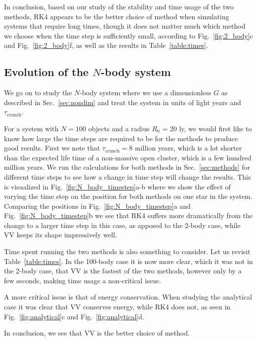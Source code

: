 \documentclass{article}
\begin{document}
\begin{multicols}{2}
In conclusion, based on our study of the stability and time usage of the two methods, RK4 appears to be the better choice of method when simulating systems that require long times, though it does not matter much which method we choose when the time step is sufficiently small, according to Fig.~\ref{fig:2_body}c and Fig.~\ref{fig:2_body}f, as well as the results in Table~\ref{table:times}.



\subsection{Evolution of the $N$-body system}
We go on to study the $N$-body system where we use a dimensionless $G$ as described in Sec.~\ref{sec:nondim} and treat the system in units of light years and $\tau_{\mathrm{crunch}}$. 

For a system with $N = 100$ objects and a radius $R_0$ = 20 ly, we would first like to know how large the time steps are required to be for the methods to produce good results. First we note that $\tau_{\mathrm{crunch}} = 8$ million years, which is a lot shorter than the expected life time of a non-massive open cluster, which is a few hundred million years. We run the calculations for both methods in Sec.~\ref{sec:methods} for different time steps to see how a change in time step will change the results. This is visualized in Fig.~\ref{fig:N_body_timestep}a-b where we show the effect of varying the time step on the position for both methods on one star in the system. Comparing the positions in Fig.~\ref{fig:N_body_timestep}a and Fig.~\ref{fig:N_body_timestep}b we see that RK4 suffers more dramatically from the change to a larger time step in this case, as apposed to the 2-body case, while VV keeps its shape impressively well.

Time spent running the two methods is also something to consider. Let us revisit Table~\ref{table:times}. In the 100-body case it is now more clear, which it was not in the 2-body case, that VV is the fastest of the two methods, however only by a few seconds, making time usage a non-critical issue.

A more critical issue is that of energy conservation. When studying the analytical case it was clear that VV conserves energy, while RK4 does not, as seen in Fig.~\ref{fig:analytical}c and Fig.~\ref{fig:analytical}d.

In conclusion, we see that VV is the better choice of method. \\



\end{multicols}
\end{document}
